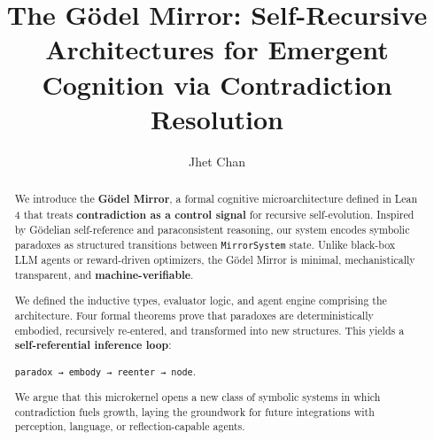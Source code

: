 \documentclass[manuscript,nonacm]{acmart}
\date{}
\begin{document}
\title{The Gödel Mirror: Self-Recursive Architectures for Emergent Cognition via Contradiction Resolution}

\author{Jhet Chan}

\renewcommand{\shortauthors}{J. Chan (Gödel Mirror)}

\begin{abstract}
  We introduce the \textbf{Gödel Mirror}, a formal cognitive microarchitecture defined in Lean 4 that treats \textbf{contradiction as a control signal} for recursive self-evolution. Inspired by Gödelian self-reference and paraconsistent reasoning, our system encodes symbolic paradoxes as structured transitions between \texttt{MirrorSystem} state. Unlike black-box LLM agents or reward-driven optimizers, the Gödel Mirror is minimal, mechanistically transparent, and \textbf{machine-verifiable}.
\par
  We defined the inductive types, evaluator logic, and agent engine comprising the architecture. Four formal theorems prove that paradoxes are deterministically embodied, recursively re-entered, and transformed into new structures. This yields a \textbf{self-referential inference loop}:

  \texttt{paradox → embody → reenter → node}.
\par
  We argue that this microkernel opens a new class of symbolic systems in which contradiction fuels growth, laying the groundwork for future integrations with perception, language, or reflection-capable agents.
\end{abstract}

\end{document}
